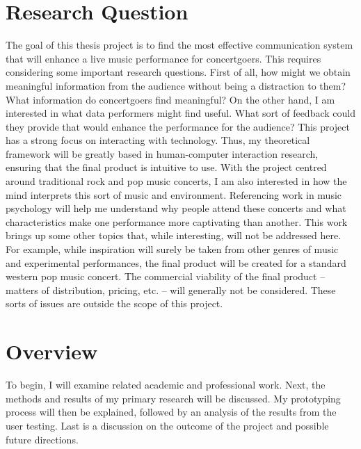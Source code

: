 
\section{Research Question}

The goal of this thesis project is to find the most effective communication system that will enhance a live music performance for concertgoers. This requires considering some important research questions. First of all, how might we obtain meaningful information from the audience without being a distraction to them? What information do concertgoers find meaningful? On the other hand, I am interested in what data performers might find useful. What sort of feedback could they provide that would enhance the performance for the audience? This project has a strong focus on interacting with technology. Thus, my theoretical framework will be greatly based in human-computer interaction research, ensuring that the final product is intuitive to use. With the project centred around traditional rock and pop music concerts, I am also interested in how the mind interprets this sort of music and environment. Referencing work in music psychology will help me understand why people attend these concerts and what characteristics make one performance more captivating than another. This work brings up some other topics that, while interesting, will not be addressed here. For example, while inspiration will surely be taken from other genres of music and experimental performances, the final product will be created for a standard western pop music concert. The commercial viability of the final product -- matters of distribution, pricing, etc. -- will generally not be considered.  These sorts of issues are outside the scope of this project.

\section{Overview}

To begin, I will examine related academic and professional work. Next, the methods and results of my primary research will be discussed. My prototyping process will then be explained, followed by an analysis of the results from the user testing. Last is a discussion on the outcome of the project and possible future directions.